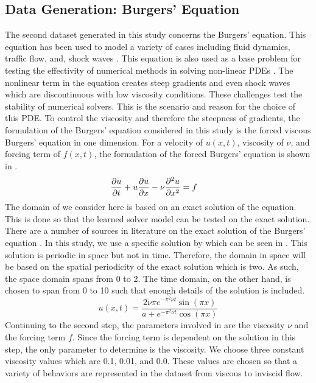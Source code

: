 \subsection{Data Generation: Burgers' Equation}
\noindent The second dataset generated in this study concerns the Burgers' equation. This equation has been used to model a variety of cases including fluid dynamics, traffic flow, and, shock waves \autocite{bonkileSystematicLiteratureReview2018,orlandiBurgersEquation2000,becBurgersTurbulence2007,jamesonEnergyEstimatesNonlinear2007}. This equation is also used as a base problem for testing the effectivity of numerical methods in solving non-linear PDEs \autocite{barterShockCapturingPDEbased2008,banksNumericalErrorEstimation2012, tabatabaeiImplicitMethodsNumerical2007,bonkileSystematicLiteratureReview2018}. The nonlinear term in the equation creates steep gradients and even shock waves which are discontinuous with low viscosity conditions. These challenges test the stability of numerical solvers. This is the scenario and reason for the choice of this PDE\@. To control the viscosity and therefore the steepness of gradients, the formulation of the Burgers' equation considered in this study is the forced viscous Burgers' equation in one dimension. For a velocity of \(u(x, t)\), viscosity of \(\nu \), and forcing term of \(f(x, t)\), the formulation of the forced Burgers' equation is shown in .
\begin{align}
  \pdv{u}{t}+u\pdv{u}{x}-\nu\pdv[2]{u}{x} & = f \label{eq:forced_viscous_burgers}
\end{align}
The domain of we consider here is based on an exact solution of the equation. This is done so that the learned solver model can be tested on the exact solution. There are a number of sources in literature on the exact solution of the Burgers' equation \autocite{bentonTableSolutionsOnedimensional1972,wazwazPartialDifferentialEquations2010,woodExactSolutionBurgers2006}. In this study, we use a specific solution by \textcite{woodExactSolutionBurgers2006} which can be seen in . This solution is periodic in space but not in time. Therefore, the domain in space will be based on the spatial periodicity of the exact solution which is two. As such, the space domain spans from 0 to 2. The time domain, on the other hand, is chosen to span from 0 to 10 such that enough details of the solution is included.
\begin{equation}
  u(x,t) = \frac{2\nu\pi e^{-\pi^2\nu t}\sin(\pi x)}{a+e^{-\pi^2\nu t}\cos(\pi x)} \label{eq:burgers_exact_solution}
\end{equation}
Continuing to the second step, the parameters involved in  are the viscosity \(\nu \) and the forcing term \(f \). Since the forcing term is dependent on the solution in this step, the only parameter to determine is the viscosity. We choose three constant viscosity values which are 0.1, 0.01, and 0.0. These values are chosen so that a variety of behaviors are represented in the dataset from viscous to inviscid flow.

